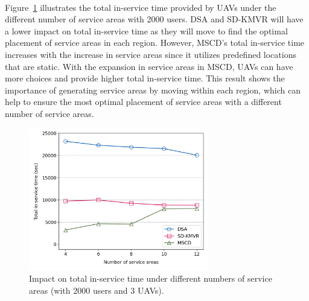 \documentclass[a4paper,12pt]{report}
\begin{document}
\paragraph{}
Figure~\ref{fig:Impact on total in-service time with different numbers of SA} illustrates the total in-service time provided by UAVs under the different number of service areas with 2000 users. DSA and SD-KMVR will have a lower impact on total in-service time as they will move to find the optimal placement of service areas in each region. However, MSCD's total in-service time increases with the increase in service areas since it utilizes predefined locations that are static. With the expansion in service areas in MSCD, UAVs can have more choices and provide higher total in-service time. This result shows the importance of generating service areas by moving within each region, which can help to ensure the most optimal placement of service areas with a different number of service areas.
\begin{figure} [h!]
    \centering
    \includegraphics[width=0.7\textwidth]{Figure 10.png}
    \caption{Impact on total in-service time under different numbers of service areas (with 2000 users and 3 UAVs).}
    \label{fig:Impact on total in-service time with different numbers of SA}
\end{figure}
\end{document}
